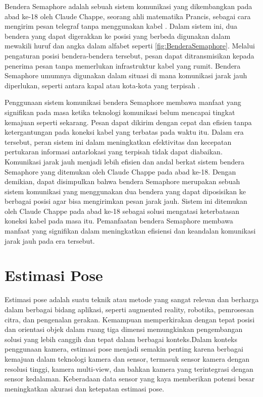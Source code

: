 Bendera Semaphore adalah sebuah sistem komunikasi yang dikembangkan pada abad ke-18 oleh Claude Chappe, seorang ahli matematika Prancis, sebagai cara mengirim pesan telegraf tanpa menggunakan kabel \cite{8752707}. Dalam sistem ini, dua bendera yang dapat digerakkan ke posisi yang berbeda digunakan dalam mewakili huruf dan angka dalam alfabet seperti \ref{fig:BenderaSemaphore}. Melalui pengaturan posisi bendera-bendera tersebut, pesan dapat ditransmisikan kepada penerima pesan tanpa memerlukan infrastruktur kabel yang rumit. Bendera Semaphore umumnya digunakan dalam situasi di mana komunikasi jarak jauh diperlukan, seperti antara kapal atau kota-kota yang terpisah \cite{gundogdu2019semaphore}.

Penggunaan sistem komunikasi bendera Semaphore membawa manfaat yang signifikan pada masa ketika teknologi komunikasi belum mencapai tingkat kemajuan seperti sekarang. Pesan dapat dikirim dengan cepat dan efisien tanpa ketergantungan pada koneksi kabel yang terbatas pada waktu itu. Dalam era tersebut, peran sistem ini dalam meningkatkan efektivitas dan kecepatan pertukaran informasi antarlokasi yang terpisah tidak dapat diabaikan. Komunikasi jarak jauh menjadi lebih efisien dan andal berkat sistem bendera Semaphore yang ditemukan oleh Claude Chappe pada abad ke-18. Dengan demikian, dapat disimpulkan bahwa bendera Semaphore merupakan sebuah sistem komunikasi yang menggunakan dua bendera yang dapat diposisikan ke berbagai posisi agar bisa mengirimkan pesan jarak jauh. Sistem ini ditemukan oleh Claude Chappe pada abad ke-18 sebagai solusi mengatasi keterbatasan koneksi kabel pada masa itu. Pemanfaatan bendera Semaphore membawa manfaat yang signifikan dalam meningkatkan efisiensi dan keandalan komunikasi jarak jauh pada era tersebut.

\section{Estimasi Pose}
Estimasi pose adalah suatu teknik atau metode yang sangat relevan dan berharga dalam berbagai bidang aplikasi, seperti augmented reality, robotika, pemrosesan citra, dan pengenalan gerakan. Kemampuan memperkirakan dengan tepat posisi dan orientasi objek dalam ruang tiga dimensi memungkinkan pengembangan solusi yang lebih canggih dan tepat dalam berbagai konteks.Dalam konteks penggunaan kamera, estimasi pose menjadi semakin penting karena berbagai kemajuan dalam teknologi kamera dan sensor, termasuk sensor kamera dengan resolusi tinggi, kamera multi-view, dan bahkan kamera yang terintegrasi dengan sensor kedalaman. Keberadaan data sensor yang kaya memberikan potensi besar  meningkatkan akurasi dan ketepatan estimasi pose.

